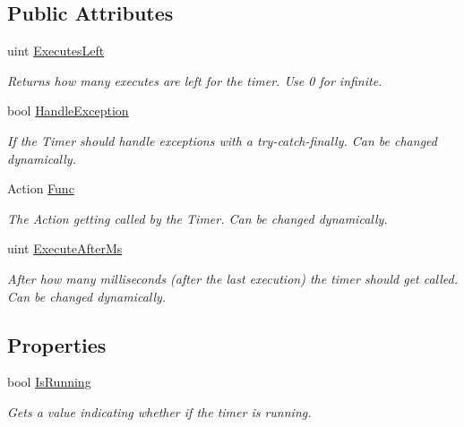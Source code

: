 \subsection*{Public Attributes}
\begin{DoxyCompactItemize}
\item 
uint \mbox{\hyperlink{class_o_e_invaders_1_1_library_1_1_c_timer_a80808297554224ddb4dc8fa9c72d9434}{Executes\+Left}}
\begin{DoxyCompactList}\small\item\em Returns how many executes are left for the timer. Use 0 for infinite. \end{DoxyCompactList}\item 
bool \mbox{\hyperlink{class_o_e_invaders_1_1_library_1_1_c_timer_ac52011ba70e815c603b5b0c5a255721e}{Handle\+Exception}}
\begin{DoxyCompactList}\small\item\em If the Timer should handle exceptions with a try-\/catch-\/finally. Can be changed dynamically. \end{DoxyCompactList}\item 
Action \mbox{\hyperlink{class_o_e_invaders_1_1_library_1_1_c_timer_a7bbc9467a211fe1cc9bf2974d00f693b}{Func}}
\begin{DoxyCompactList}\small\item\em The Action getting called by the Timer. Can be changed dynamically. \end{DoxyCompactList}\item 
uint \mbox{\hyperlink{class_o_e_invaders_1_1_library_1_1_c_timer_a395275cb9c913d2b84a82953364b2c16}{Execute\+After\+Ms}}
\begin{DoxyCompactList}\small\item\em After how many milliseconds (after the last execution) the timer should get called. Can be changed dynamically. \end{DoxyCompactList}\end{DoxyCompactItemize}
\subsection*{Properties}
\begin{DoxyCompactItemize}
\item 
bool \mbox{\hyperlink{class_o_e_invaders_1_1_library_1_1_c_timer_a4c86b1242a54306eaaef498f81c7969c}{Is\+Running}}
\begin{DoxyCompactList}\small\item\em Gets a value indicating whether if the timer is running. \end{DoxyCompactList}\end{DoxyCompactItemize}


